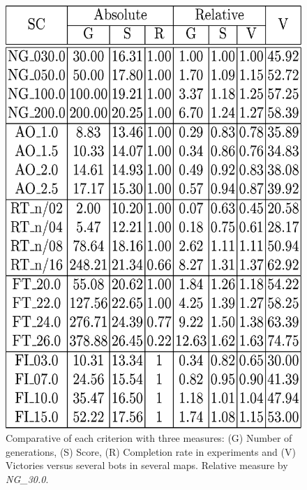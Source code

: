 \documentclass[runningheads,a4paper]{llncs}
\begin{document}
\begin{figure}[h!tb]
\begin{minipage}[b]{.40\columnwidth}
\includegraphics[width=1\columnwidth]{imags/tabla.eps}

\caption{Comparative of each criterion with three measures: (G) Number of generations, (S) Score, (R) Completion rate in experiments and (V) Victories versus several bots in several maps. Relative measure by \textit{NG\_30.0}.}
\label{fig:table}
\end{minipage}
\end{figure}





%
\end{document}
